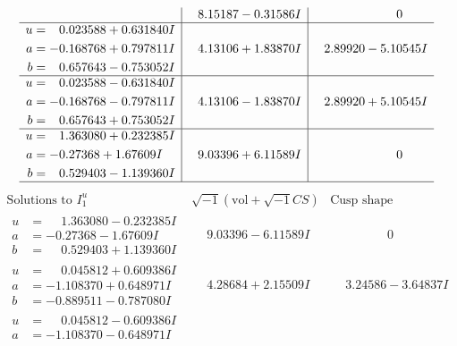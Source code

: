 \documentclass[1p]{elsarticle_modified}
\theoremstyle{definition}
\newcommand{\I}{\sqrt{-1}}
\begin{document}
$$\begin{array}{c|c|c}
 & \phantom{-}8.15187 - 0.31586 I & \phantom{-0.000000 } 0 \\ \hline\begin{aligned}
u &= \phantom{-}0.023588 + 0.631840 I \\
a &= -0.168768 + 0.797811 I \\
b &= \phantom{-}0.657643 - 0.753052 I\end{aligned}
 & \phantom{-}4.13106 + 1.83870 I & \phantom{-}2.89920 - 5.10545 I \\ \hline\begin{aligned}
u &= \phantom{-}0.023588 - 0.631840 I \\
a &= -0.168768 - 0.797811 I \\
b &= \phantom{-}0.657643 + 0.753052 I\end{aligned}
 & \phantom{-}4.13106 - 1.83870 I & \phantom{-}2.89920 + 5.10545 I \\ \hline\begin{aligned}
u &= \phantom{-}1.363080 + 0.232385 I \\
a &= -0.27368 + 1.67609 I \\
b &= \phantom{-}0.529403 - 1.139360 I\end{aligned}
 & \phantom{-}9.03396 + 6.11589 I & \phantom{-0.000000 } 0\\
 \hline 
 \end{array}$$\newpage$$\begin{array}{c|c|c}  
\text{Solutions to }I^u_{1}& \I (\text{vol} + \sqrt{-1}CS) & \text{Cusp shape}\\
 \hline 
\begin{aligned}
u &= \phantom{-}1.363080 - 0.232385 I \\
a &= -0.27368 - 1.67609 I \\
b &= \phantom{-}0.529403 + 1.139360 I\end{aligned}
 & \phantom{-}9.03396 - 6.11589 I & \phantom{-0.000000 } 0 \\ \hline\begin{aligned}
u &= \phantom{-}0.045812 + 0.609386 I \\
a &= -1.108370 + 0.648971 I \\
b &= -0.889511 - 0.787080 I\end{aligned}
 & \phantom{-}4.28684 + 2.15509 I & \phantom{-}3.24586 - 3.64837 I \\ \hline\begin{aligned}
u &= \phantom{-}0.045812 - 0.609386 I \\
a &= -1.108370 - 0.648971 I \\

\end{aligned}
\end{array}$$
\end{document}
